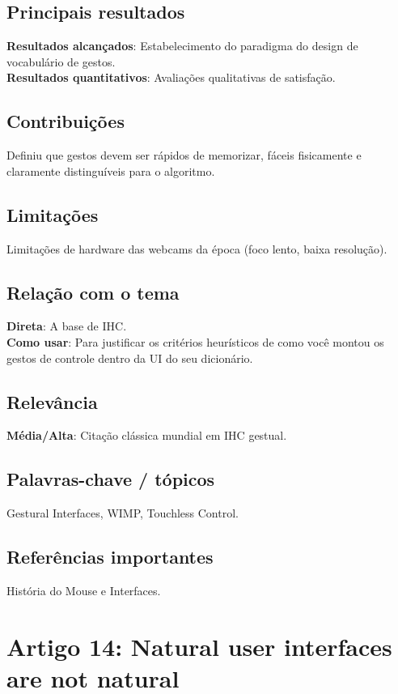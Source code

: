 \documentclass[12pt, a4paper]{article}
\begin{document}
\subsection{Principais resultados}
\textbf{Resultados alcançados}: Estabelecimento do paradigma do design de vocabulário de gestos.\\
\textbf{Resultados quantitativos}: Avaliações qualitativas de satisfação.\\
\subsection{Contribuições}
Definiu que gestos devem ser rápidos de memorizar, fáceis fisicamente e claramente distinguíveis para o algoritmo.\\
\subsection{Limitações}
Limitações de hardware das webcams da época (foco lento, baixa resolução).\\
\subsection{Relação com o tema}
\textbf{Direta}: A base de IHC.\\
\textbf{Como usar}: Para justificar os critérios heurísticos de como você montou os gestos de controle dentro da UI do seu dicionário.\\
\subsection{Relevância}
\textbf{Média/Alta}: Citação clássica mundial em IHC gestual.\\
\subsection{Palavras-chave / tópicos}
Gestural Interfaces, WIMP, Touchless Control.\\
\subsection{Referências importantes}
História do Mouse e Interfaces.
\newpage

\section{Artigo 14: Natural user interfaces are not natural}
\end{document}
